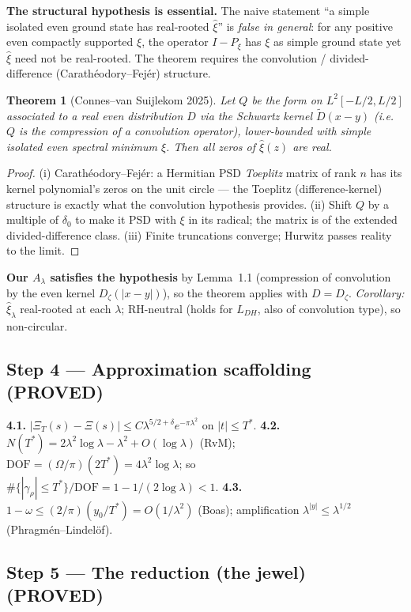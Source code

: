 \documentclass[11pt]{article}
\newtheorem{theorem}{Theorem}[section]
\theoremstyle{remark}
\newcommand{\PROVED}{\textbf{(PROVED)}}
\begin{document}
\textbf{The structural hypothesis is essential.} The naive statement ``a simple isolated even
ground state has real-rooted $\hat\xi$'' is \emph{false in general}: for any positive even
compactly supported $\xi$, the operator $I-P_\xi$ has $\xi$ as simple ground state yet $\hat\xi$
need not be real-rooted. The theorem requires the convolution / divided-difference
(Carath\'eodory--Fej\'er) structure.
\begin{theorem}[Connes--van Suijlekom 2025]
Let $Q$ be the form on $L^2[-L/2,L/2]$ associated to a real even distribution $D$ via the
Schwartz kernel $\widetilde D(x-y)$ (i.e.\ $Q$ is the compression of a convolution operator),
lower-bounded with simple isolated even spectral minimum $\xi$. Then all zeros of $\hat\xi(z)$
are real.
\end{theorem}
\begin{proof}
(i) Carath\'eodory--Fej\'er: a Hermitian PSD \emph{Toeplitz} matrix of rank $n$ has its kernel
polynomial's zeros on the unit circle --- the Toeplitz (difference-kernel) structure is exactly
what the convolution hypothesis provides. (ii) Shift $Q$ by a multiple of $\delta_0$ to make it
PSD with $\xi$ in its radical; the matrix is of the extended divided-difference class. (iii)
Finite truncations converge; Hurwitz passes reality to the limit.
\end{proof}
\noindent\textbf{Our $A_\lambda$ satisfies the hypothesis} by Lemma~1.1 (compression of
convolution by the even kernel $D_\zeta(|x-y|)$), so the theorem applies with $D=D_\zeta$.
\emph{Corollary:} $\hat\xi_\lambda$ real-rooted at each $\lambda$; RH-neutral (holds for $L_{DH}$,
also of convolution type), so non-circular.

\subsection{Step 4 --- Approximation scaffolding \PROVED}

\textbf{4.1.} $|\Xi_T(s)-\Xi(s)|\le C\lambda^{5/2+\delta}e^{-\pi\lambda^2}$ on $|t|\le T^*$.\quad
\textbf{4.2.} $N(T^*)=2\lambda^2\log\lambda-\lambda^2+O(\log\lambda)$ (RvM);
$\mathrm{DOF}=(\Omega/\pi)(2T^*)=4\lambda^2\log\lambda$; so
$\#\{|\gamma_\rho|\le T^*\}/\mathrm{DOF}=1-1/(2\log\lambda)<1$.\quad
\textbf{4.3.} $1-\omega\le(2/\pi)(y_0/T^*)=O(1/\lambda^2)$ (Boas); amplification
$\lambda^{|y|}\le\lambda^{1/2}$ (Phragm\'en--Lindel\"of).

\subsection{Step 5 --- The reduction (the jewel) \PROVED}
\end{document}
